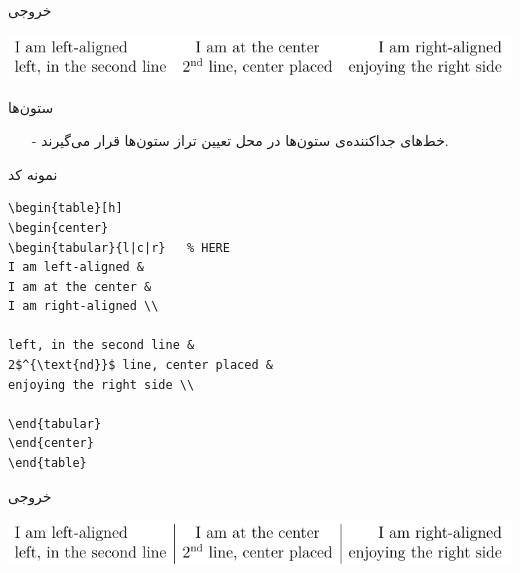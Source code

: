 \begin{frame}{خروجی}
\begin{center}
\includegraphics[width=\textwidth]{docs/images/simple-table}
\end{center}
\end{frame}

\begin{frame}{ستون‌ها}
\begin{itemize}\itemr
\item[-]
خط‌های جداکننده‌ی ستون‌ها در محل تعیین تراز ستون‌ها قرار می‌گیرند.
\end{itemize}
\end{frame}

\begin{frame}[fragile]{نمونه کد}
\begin{latin}
\begin{lstlisting}[keywords={begin, end}, keywordstyle=\color{Mulberry}\textbf]
\begin{table}[h]
\begin{center}
\begin{tabular}{l|c|r}   % HERE
I am left-aligned & 
I am at the center & 
I am right-aligned \\

left, in the second line &
2$^{\text{nd}}$ line, center placed &
enjoying the right side \\

\end{tabular}
\end{center}
\end{table}
\end{lstlisting}
\end{latin}
\end{frame}

\begin{frame}{خروجی}
\begin{center}
\includegraphics[width=\textwidth]{docs/images/1}
\end{center}
\end{frame}

